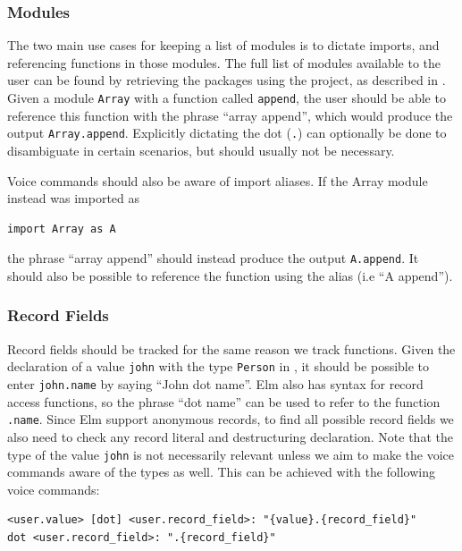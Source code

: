 \documentclass[../thesis.tex]{subfiles}
\begin{document}
\subsubsection{Modules}%
\label{par:modules}
The two main use cases for keeping a list of modules is to dictate imports, and referencing functions in those modules.
The full list of modules available to the user can be found by retrieving the packages using the project, as described in .
Given a module \texttt{Array} with a function called \texttt{append}, the user should be able to
reference this function with the phrase ``array append'', which would produce the output \texttt{Array.append}.
Explicitly dictating the dot (\texttt{.}) can optionally be done to disambiguate in certain scenarios, but should usually not be necessary.

Voice commands should also be aware of import aliases.
If the Array module instead was imported as
\begin{verbatim}
import Array as A
\end{verbatim}
the phrase ``array append'' should instead produce the output \texttt{A.append}.
It should also be possible to reference the function using the alias (i.e ``A append'').

\subsubsection{Record Fields}
Record fields should be tracked for the same reason we track functions.
Given the declaration of a value \texttt{john} with the type \texttt{Person} in ,
it should be possible to enter \texttt{john.name} by saying ``John dot name''.
Elm also has syntax for record access functions, so the phrase ``dot name'' can be used to
refer to the function \texttt{.name}.
Since Elm support anonymous records, to find all possible record fields we also need to check
any record literal and destructuring declaration.
Note that the type of the value \texttt{john} is not necessarily relevant unless we
aim to make the voice commands aware of the types as well. %
This can be achieved with the following voice commands:
\begin{verbatim}
<user.value> [dot] <user.record_field>: "{value}.{record_field}"
dot <user.record_field>: ".{record_field}"
\end{verbatim}
\end{document}
